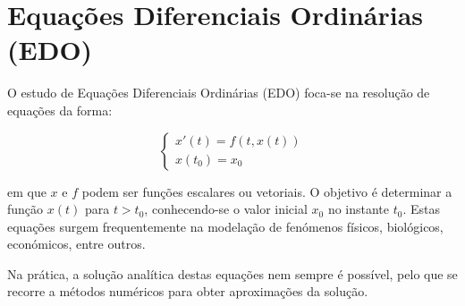 
\chapter{Equações Diferenciais Ordinárias (EDO)}

O estudo de Equações Diferenciais Ordinárias (EDO) foca-se na resolução de equações da forma:

\begin{equation}
\begin{cases}
x'(t) = f(t, x(t)) \\
x(t_0) = x_0
\end{cases}
\end{equation}

em que $x$ e $f$ podem ser funções escalares ou vetoriais. O objetivo é determinar a função $x(t)$ para $t > t_0$, conhecendo-se o valor inicial $x_0$ no instante $t_0$. Estas equações surgem frequentemente na modelação de fenómenos físicos, biológicos, económicos, entre outros.

Na prática, a solução analítica destas equações nem sempre é possível, pelo que se recorre a métodos numéricos para obter aproximações da solução.